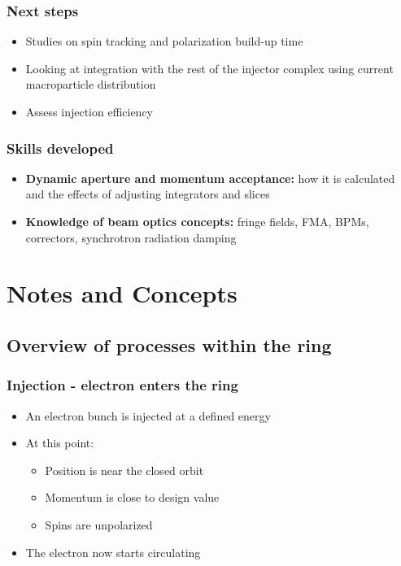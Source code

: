 \documentclass{article}
\begin{document}
\subsubsection{Next steps}
\begin{itemize}
    \item Studies on spin tracking and polarization build-up time
    \item Looking at integration with the rest of the injector complex using current macroparticle distribution
    \item Assess injection efficiency
\end{itemize}

\subsubsection{Skills developed}
\begin{itemize}
    \item \textbf{Dynamic aperture and momentum acceptance:} how it is calculated and the effects of adjusting integrators and slices
    \item \textbf{Knowledge of beam optics concepts:} fringe fields, FMA, BPMs, correctors, synchrotron radiation damping
\end{itemize}


\section{Notes and Concepts}
\subsection{Overview of processes within the ring}
\subsubsection{Injection - electron enters the ring}
\begin{itemize}
\item An electron bunch is injected at a defined energy
\item At this point:
    \begin{itemize}
    \item Position is near the closed orbit
    \item Momentum is close to design value
    \item Spins are unpolarized
    \end{itemize}
\item The electron now starts circulating
\end{itemize}
\end{document}
